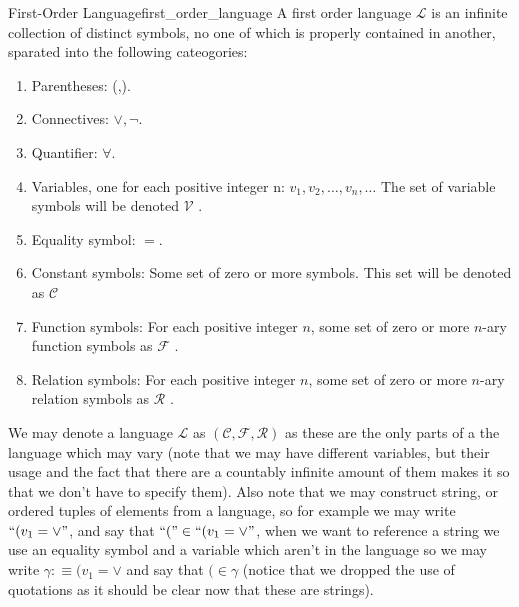 \begin{definition}{First-Order Language}{first_order_language}
	A first order language $\mathcal{L}$ is an infinite collection of distinct symbols, no one of which is properly contained in another, sparated into the following cateogories:
	\begin{enumerate}
		\item Parentheses: (,).
		\item Connectives: $\lor, \neg$.
		\item Quantifier: $\forall$.
		\item Variables, one for each positive integer n: $v_{1}, v_{2}, \ldots, v_{n}, \ldots$ The set of variable symbols will be denoted $ \mathcal{ V }   $ .
		\item Equality symbol: $=$.
		\item Constant symbols: Some set of zero or more symbols. This set will be denoted as $ \mathcal{ C }   $ 
		\item Function symbols: For each positive integer $n$, some set of zero or more $n$-ary function symbols as $ \mathcal{ F }  $ .
		\item Relation symbols: For each positive integer $n$, some set of zero or more $n$-ary relation symbols as $ \mathcal{ R }  $ .
	\end{enumerate}
\end{definition}
We may denote a language $ \mathcal{ L }   $ as $ \left( \mathcal{ C } , \mathcal{ F } , \mathcal{ R }      \right)  $ as these are the only parts of a the language which may vary (note that we may have different variables, but their usage and the fact that there are a countably infinite amount of them makes it so that we don't have to specify them). Also note that we may construct string, or ordered tuples of elements from a language, so for example we may write $ ``( v _{ 1 } = \lor"  $, and say that $ ``(" \in ``( v _{ 1 } = \lor"  $, when we want to reference a string we use an equality symbol and a variable which aren't in the language so we may write $ \gamma :\equiv ( v _{ 1 } = \lor  $ and say that $ ( \in  \gamma $ (notice that we dropped the use of quotations as it should be clear now that these are strings).

